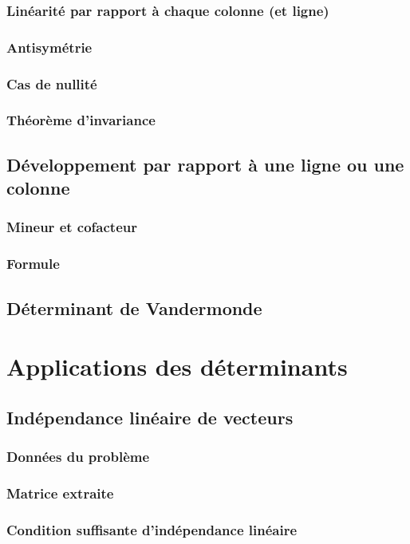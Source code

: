 \documentclass[12pt,a4paper,french]{book}
\begin{document}
			\subsubsection{Linéarité par rapport à chaque colonne (et ligne)}
			\subsubsection{Antisymétrie}
			\subsubsection{Cas de nullité}
			\subsubsection{Théorème d'invariance}
		\subsection{Développement par rapport à une ligne ou une colonne}
			\subsubsection{Mineur et cofacteur}
			\subsubsection{Formule}
		\subsection{Déterminant de Vandermonde}
	\section{Applications des déterminants}
		\subsection{Indépendance linéaire de vecteurs}
			\subsubsection{Données du problème}
			\subsubsection{Matrice extraite}
			\subsubsection{Condition suffisante d'indépendance linéaire}
\end{document}
